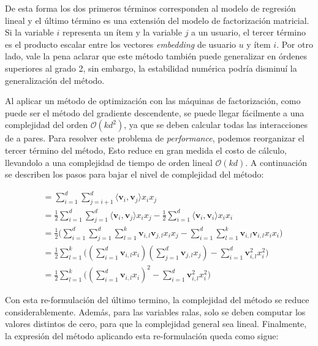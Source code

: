 \documentclass[11pt,a4paper,twoside]{thesis}
\begin{document}
De esta forma los dos primeros términos corresponden al modelo de regresión
lineal y el último término es una extensión del modelo de factorización
matricial. Si la variable $i$ representa un ítem y la variable $j$ a un
usuario, el tercer término es el producto escalar entre los vectores
\textit{embedding} de usuario $u$ y ítem $i$. Por otro lado, vale la pena
aclarar que este método también puede generalizar en órdenes superiores al
grado 2, sin embargo, la estabilidad numérica podría disminuí la generalización
del método.

Al aplicar un método de optimización con las máquinas de factorización, como
puede ser el método del gradiente descendente, se puede llegar fácilmente a una
complejidad del orden $\mathcal{O}(kd^2)$, ya que se deben calcular todas las
interacciones de a pares. Para resolver este problema de \textit{performance},
podemos reorganizar el tercer término del método, Esto reduce en gran medida el
costo de cálculo, llevandolo a una complejidad de tiempo de orden lineal
$\mathcal{O}(kd)$. A continuación se describen los pasos para bajar el nivel de
complejidad del método:

\begin{equation}
	\begin{split}
		&=\sum_{i=1}^d \sum_{j=i+1}^d \langle\mathbf{v}_i, \mathbf{v}_j\rangle x_i x_j \\
		&= \frac{1}{2} \sum_{i=1}^d \sum_{j=1}^d\langle\mathbf{v}_i, \mathbf{v}_j\rangle x_i x_j - \frac{1}{2}\sum_{i=1}^d \langle\mathbf{v}_i, \mathbf{v}_i\rangle x_i x_i \\
		&= \frac{1}{2} \big (\sum_{i=1}^d \sum_{j=1}^d \sum_{l=1}^k\mathbf{v}_{i, l} \mathbf{v}_{j, l} x_i x_j - \sum_{i=1}^d \sum_{l=1}^k \mathbf{v}_{i, l} \mathbf{v}_{i, l} x_i x_i \big)\\
		&=  \frac{1}{2} \sum_{l=1}^k \big ((\sum_{i=1}^d \mathbf{v}_{i, l} x_i) (\sum_{j=1}^d \mathbf{v}_{j, l}x_j) - \sum_{i=1}^d \mathbf{v}_{i, l}^2 x_i^2 \big ) \\
		&= \frac{1}{2} \sum_{l=1}^k \big ((\sum_{i=1}^d \mathbf{v}_{i, l} x_i)^2 - \sum_{i=1}^d \mathbf{v}_{i, l}^2 x_i^2)
	\end{split}
\end{equation}

Con esta re-formulación del último termino, la complejidad del método se reduce
considerablemente. Además, para las variables ralas, solo se deben computar los
valores distintos de cero, para que la complejidad general sea lineal.
Finalmente, la expresión del método aplicando esta re-formulación queda como
sigue:
\end{document}
